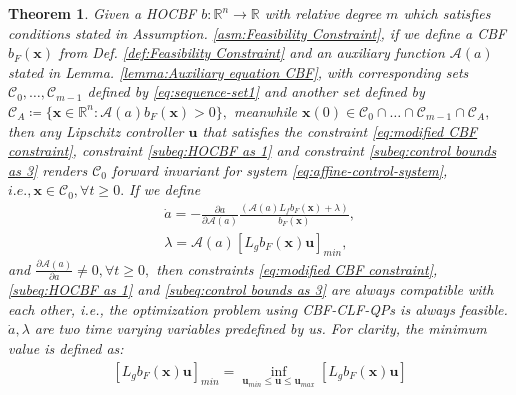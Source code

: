 \documentclass[letterpaper, 10 pt, conference]{ieeeconf}
\newtheorem{theorem}{Theorem}
\theoremstyle{definition}
\begin{document}
\begin{theorem}
\label{thm:feasibility and safety}
Given a HOCBF $b:\mathbb{R}^{n}\to\mathbb{R}$ with relative degree $m$ which satisfies conditions stated in Assumption. \ref{asm:Feasibility Constraint}, if we define a CBF $b_{F}(\boldsymbol{x})$ from Def. \ref{def:Feasibility Constraint} and an auxiliary function $\mathcal{A}(a)$ stated in Lemma. \ref{lemma:Auxiliary equation CBF},  with corresponding sets $\mathcal{C}_{0}, \dots,\mathcal {C}_{m-1}$ defined by \eqref{eq:sequence-set1} and another set defined by $\mathcal C_{A}\coloneqq \{\boldsymbol{x}\in\mathbb{R}^{n}:\mathcal{A}(a)b_{F}(\boldsymbol{x})> 0\},$ meanwhile $\boldsymbol{x}(0) \in \mathcal {C}_{0}\cap \dots \cap \mathcal {C}_{m-1}\cap \mathcal C_{A},$ then any Lipschitz controller $\boldsymbol{u}$ that satisfies the constraint \eqref{eq:modified CBF constraint}, constraint \eqref{subeq:HOCBF as 1} and constraint \eqref{subeq:control bounds as 3} renders $\mathcal {C}_{0}$ forward invariant for system \eqref{eq:affine-control-system}, $i.e., \boldsymbol{x} \in \mathcal {C}_{0}, \forall t\ge 0.$ If  we define
\begin{equation}
\label{eq:pre-defined variables}
\begin{split}
\dot{a}=-\frac{\partial a}{\partial \mathcal{A}(a)}\frac{(\mathcal{A}(a)L_{f}b_{F}(\boldsymbol{x})+\lambda)}{b_{F}(\boldsymbol{x})},\\
\lambda=\mathcal{A}(a)[L_{g}b_{F}(\boldsymbol{x})\boldsymbol{u}]_{min},
\end{split}
\end{equation}
 and $\frac{\partial \mathcal{A}(a)}{\partial a}\ne 0,\forall t\ge 0,$ then constraints \eqref{eq:modified CBF constraint}, \eqref{subeq:HOCBF as 1} and \eqref{subeq:control bounds as 3} are always compatible with each other, i.e., the optimization problem using CBF-CLF-QPs is always feasible. $\dot{a}, \lambda$ are two time varying variables predefined by us. For clarity, the minimum value is defined as:
\begin{equation}
\label{eq:minimum value}
\begin{split}
[L_{g}b_{F}(\boldsymbol{x})\boldsymbol{u}]_{min}=\inf_{\boldsymbol{u}_{min}\le \boldsymbol{u} \le \boldsymbol{u}_{max}}[L_{g}b_{F}(\boldsymbol{x})\boldsymbol{u}]
\end{split}
\end{equation}
\end{theorem}
\end{document}
